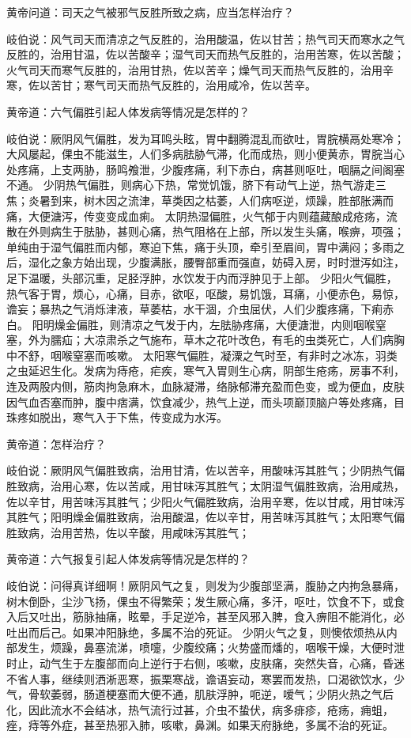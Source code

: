 \documentclass[12pt,UTF8]{ctexbook}
\begin{document}
黄帝问道：司天之气被邪气反胜所致之病，应当怎样治疗？

岐伯说：风气司天而清凉之气反胜的，治用酸温，佐以甘苦；热气司天而寒水之气反胜的，治用甘温，佐以苦酸辛；湿气司天而热气反胜的，治用苦寒，佐以苦酸；火气司天而寒气反胜的，治用甘热，佐以苦辛；燥气司天而热气反胜的，治用辛寒，佐以苦甘；寒气司天而热气反胜的，治用咸冷，佐以苦辛。

黄帝道：六气偏胜引起人体发病等情况是怎样的？

岐伯说：厥阴风气偏胜，发为耳鸣头眩，胃中翻腾混乱而欲吐，胃脘横鬲处寒冷；大风屡起，倮虫不能滋生，人们多病胠胁气滞，化而成热，则小便黄赤，胃脘当心处疼痛，上支两胁，肠鸣飧泄，少腹疼痛，利下赤白，病甚则呕吐，咽膈之间阁塞不通。
少阴热气偏胜，则病心下热，常觉饥饿，脐下有动气上逆，热气游走三焦；炎暑到来，树木因之流津，草类因之枯萎，人们病呕逆，烦躁，胜部胀满而痛，大便溏泻，传变变成血痢。
太阴热湿偏胜，火气郁于内则蕴藏酿成疮疡，流散在外则病生于胠胁，甚则心痛，热气阻格在上部，所以发生头痛，喉痹，项强；单纯由于湿气偏胜而内郁，寒迫下焦，痛于头顶，牵引至眉间，胃中满闷；多雨之后，湿化之象方始出现，少腹满胀，腰臀部重而强直，妨碍入房，时时泄泻如注，足下温暖，头部沉重，足胫浮肿，水饮发于内而浮肿见于上部。
少阳火气偏胜，热气客于胃，烦心，心痛，目赤，欲呕，呕酸，易饥饿，耳痛，小便赤色，易惊，谵妄；暴热之气消烁津液，草萎枯，水干涸，介虫屈伏，人们少腹疼痛，下痢赤白。
阳明燥金偏胜，则清凉之气发于内，左胠胁疼痛，大便溏泄，内则咽喉窒塞，外为臑疝；大凉肃杀之气施布，草木之花叶改色，有毛的虫类死亡，人们病胸中不舒，咽喉窒塞而咳嗽。
太阳寒气偏胜，凝潥之气时至，有非时之冰冻，羽类之虫延迟生化。发病为痔疮，疟疾，寒气入胃则生心病，阴部生疮疡，房事不利，连及两股内侧，筋肉拘急麻木，血脉凝滞，络脉郁滞充盈而色变，或为便血，皮肤因气血否塞而肿，腹中痞满，饮食减少，热气上逆，而头项巅顶脑户等处疼痛，目珠疼如脱出，寒气入于下焦，传变成为水泻。

黄帝道：怎样治疗？

岐伯说：厥阴风气偏胜致病，治用甘清，佐以苦辛，用酸味泻其胜气；少阴热气偏胜致病，治用心寒，佐以苦咸，用甘味泻其胜气；太阴湿气偏胜致病，治用咸热，佐以辛甘，用苦味泻其胜气；少阳火气偏胜致病，治用辛寒，佐以甘咸，用甘味泻其胜气；阳明燥金偏胜致病，治用酸温，佐以辛甘，用苦味泻其胜气；太阳寒气偏胜致病，治用苦热，佐以辛酸，用咸味泻其胜气；

黄帝道：六气报复引起人体发病等情况是怎样的？

岐伯说：问得真详细啊！厥阴风气之复，则发为少腹部坚满，腹胁之内拘急暴痛，树木倒卧，尘沙飞扬，倮虫不得繁荣；发生厥心痛，多汗，呕吐，饮食不下，或食入后又吐出，筋脉抽痛，眩晕，手足逆冷，甚至风邪入脾，食入痹阻不能消化，必吐出而后己。如果冲阳脉绝，多属不治的死证。
少阴火气之复，则懊侬烦热从内部发生，烦躁，鼻塞流涕，喷嚏，少腹绞痛；火势盛而燔的，咽喉干燥，大便时泄时止，动气生于左腹部而向上逆行于右侧，咳嗽，皮肤痛，突然失音，心痛，昏迷不省人事，继续则洒淅恶寒，振栗寒战，谵语妄动，寒罢而发热，口渴欲饮水，少气，骨软萎弱，肠道梗塞而大便不通，肌肤浮肿，呃逆，嗳气；少阴火热之气后化，因此流水不会结冰，热气流行过甚，介虫不蛰伏，病多痱疹，疮疡，痈蛆，痤，痔等外症，甚至热邪入肺，咳嗽，鼻渊。如果天府脉绝，多属不治的死证。
\end{document}
